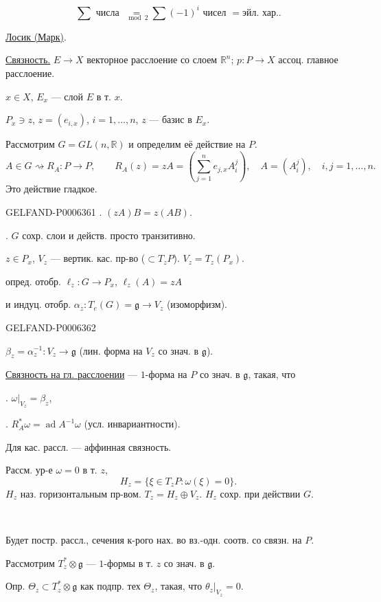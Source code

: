 \[
\sum\text{ числа }
\underset{\bmod 2}{=}
\sum(-1)^i\text{ чисел }=\text{эйл. хар.}.
\]

\underline{Лосик (Марк)}.

\underline{Связность.} \(E\to X\) векторное расслоение со слоем \(\mathbb R^n\);
\(p:P\to X\) ассоц. главное расслоение.

\(x\in X\), \(E_x\) --- слой \(E\) в т. \(x\).

\(P_x\ni z\), \(z=(e_{i,x})\), \(i=1,\ldots,n\),
\(z\) --- базис в \(E_x\).

Рассмотрим \(G=GL(n,\mathbb R)\) и определим её действие на \(P\).
\[
A\in G\rightsquigarrow R_A:P\to P,\qquad
R_A(z)=zA=\left(\sum_{j=1}^{n}e_{j,x}A_i^j\right),
\quad A=(A_i^j),\quad i,j=1,\ldots,n.
\]
Это действие гладкое.


\begin{GelfandAdjacentEvidence}{GELFAND-P000636}{1}
. \((zA)B=z(AB)\).

. \(G\) сохр. слои и действ. просто транзитивно.

\(z\in P_x\), \(V_z\) --- вертик. кас. пр-во (\(\subset T_zP\)).
\(V_z=T_z(P_x)\).

опред. отобр. \(\ell_z:G\to P_x\), \(\ell_z(A)=zA\)

и индуц. отобр. \(\alpha_z:T_e(G)=\mathfrak g\to V_z\) (изоморфизм).
\end{GelfandAdjacentEvidence}
\begin{GelfandAdjacentEvidence}{GELFAND-P000636}{2}


\(\beta_z=\alpha_z^{-1}:V_z\to\mathfrak g\)
(лин. форма на \(V_z\) со знач. в \(\mathfrak g\)).

\underline{Связность на гл. расслоении} --- \(1\)-форма на \(P\) со знач. в \(\mathfrak g\), такая, что

. \(\omega|_{V_z}=\beta_z\),

. \(R_A^*\omega=\operatorname{ad}A^{-1}\omega\) (усл. инвариантности).

Для кас. рассл. --- аффинная связность.

Рассм. ур-е \(\omega=0\) в т. \(z\),
\[
H_z=\{\xi\in T_zP:\omega(\xi)=0\}.
\]
\(H_z\) наз. горизонтальным пр-вом.
\(T_z=H_z\oplus V_z\).
\(H_z\) сохр. при действии \(G\).

\begin{center}\textemdash\,\textperiodcentered\,\textemdash\end{center}

Будет постр. рассл., сечения к-рого нах. во вз.-одн. соотв. со связн. на \(P\).

Рассмотрим \(T_z^*\otimes\mathfrak g\) --- \(1\)-формы в т. \(z\) со знач. в \(\mathfrak g\).

Опр. \(\Theta_z\subset T_z^*\otimes\mathfrak g\) как подпр. тех \(\Theta_z\), такая, что
\(\theta_z|_{V_z}=0\).
\end{GelfandAdjacentEvidence}
